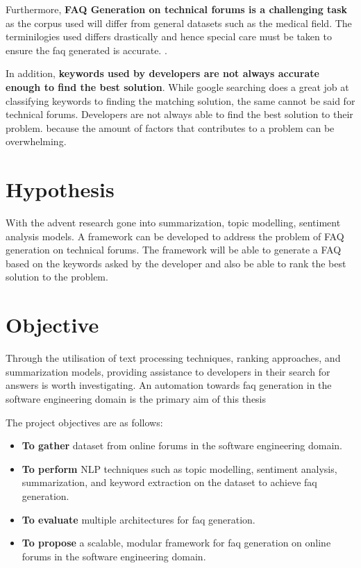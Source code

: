Furthermore, \textbf{FAQ Generation on technical forums is a challenging task} as the corpus used will differ from general datasets such as the medical field. The terminilogies used differs drastically and hence special care must be taken to ensure the faq generated is accurate. \cite{stopwords_2} \cite{stopwords_1}.

In addition, \textbf{keywords used by developers are not always accurate enough to find the best solution}. While google searching does a great job at classifying keywords to finding the matching solution, the same cannot be said for technical forums. Developers are not always able to find the best solution to their problem. \cite{bugs_nightmare} because the amount of factors that contributes to a problem can be overwhelming.

\pagebreak
\section{Hypothesis}
With the advent research gone into summarization, topic modelling, sentiment analysis models. A framework can be developed to address the problem of FAQ generation on technical forums. The framework will be able to generate a FAQ based on the keywords asked by the developer and also be able to rank the best solution to the problem.

\vspace{1cm}
\section{Objective}
Through the utilisation of text processing techniques, ranking approaches, and summarization models, providing assistance to developers in their search for answers is worth investigating. An automation towards faq generation in the software engineering domain is the primary aim of this thesis

The project objectives are as follows:
\begin{itemize}
    \item \textbf{To gather} dataset from online forums in the software engineering domain.
    \item \textbf{To perform} NLP techniques such as topic modelling, sentiment analysis, summarization, and keyword extraction on the dataset to achieve faq generation.
    \item \textbf{To evaluate} multiple architectures for faq generation.
    \item \textbf{To propose} a scalable, modular framework for faq generation on online forums in the software engineering domain.
\end{itemize}

